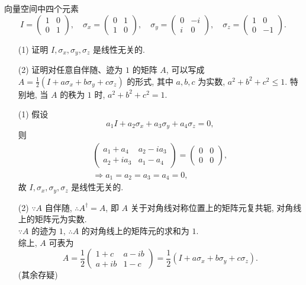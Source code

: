 \documentclass{assignment}
\begin{document}
\begin{prob}
    向量空间中四个元素
    \[
        I=\begin{pmatrix}
            1&0\\
            0&1
        \end{pmatrix},\quad\sigma_x=\begin{pmatrix}
            0&1\\
            1&0
        \end{pmatrix},\quad\sigma_y=\begin{pmatrix}
            0&-i\\
            i&0
        \end{pmatrix},\quad\sigma_z=\begin{pmatrix}
            1&0\\
            0&-1
        \end{pmatrix}.
    \]
    \begin{itemize}
        \item[(1)] 证明 $I,\sigma_x,\sigma_y,\sigma_z$ 是线性无关的.
        \item[(2)] 证明对任意自伴随、迹为 $1$ 的矩阵 $A$, 可以写成 $A=\frac{1}{2}(I+a\sigma_x+b\sigma_y+c\sigma_z)$ 的形式, 其中 $a,b,c$ 为实数, $a^2+b^2+c^2\leq 1$. 特别地, 当 $A$ 的秩为 $1$ 时, $a^2+b^2+c^2=1$.
    \end{itemize}
\end{prob}
\begin{pf}
    \begin{itemize}
        \item[(1)] 假设
        \[
            a_1I+a_2\sigma_x+a_3\sigma_y+a_4\sigma_z=0,
        \]
        则
        \begin{gather*}
            \begin{pmatrix}
                a_1+a_4&a_2-ia_3\\
                a_2+ia_3&a_1-a_4
            \end{pmatrix}=\begin{pmatrix}
                0&0\\
                0&0
            \end{pmatrix},\\
            \Longrightarrow a_1=a_2=a_3=a_4=0,
        \end{gather*}
        故 $I,\sigma_x,\sigma_y,\sigma_z$ 是线性无关的.
        \item[(2)] $\because A$ 自伴随, $\therefore A^{\dagger}=A$, 即 $A$ 关于对角线对称位置上的矩阵元复共轭, 对角线上的矩阵元为实数.\\
        $\because A$ 的迹为 $1$, $\therefore A$ 的对角线上的矩阵元的求和为 $1$.\\
        综上, $A$ 可表为
        \[
            A=\frac{1}{2}\begin{pmatrix}
                1+c&a-ib\\
                a+ib&1-c
            \end{pmatrix}=\frac{1}{2}(I+a\sigma_x+b\sigma_y+c\sigma_z).
        \]
        (其余存疑)
    \end{itemize}
\end{pf}
\end{document}
